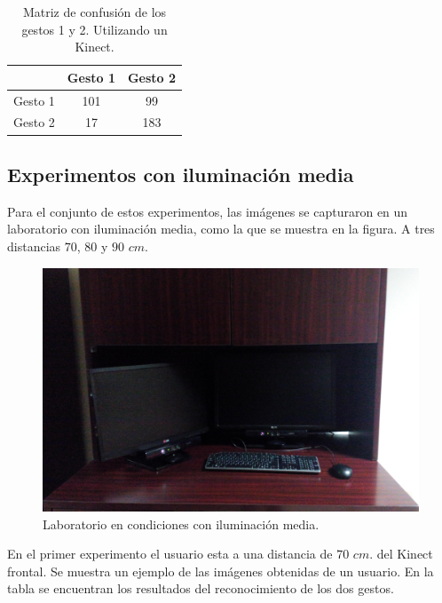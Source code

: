 \begin{table}[h!] 
\begin{center}
\begin{tabular}{ r || c | c |} 
 
        & Gesto 1 & Gesto 2 \\ \hline \hline  
Gesto 1 &  101   & 99      \\ \hline  
Gesto 2 &  17    & 183     \\   

\end{tabular}
\end{center} 
\caption{Matriz de confusión de los gestos 1 y 2. Utilizando un Kinect.}
\end{table} 

\subsection{Experimentos con iluminación media} 
Para el conjunto de estos experimentos, las imágenes se capturaron en un laboratorio con iluminación media, como la que se muestra en la figura. A tres distancias $70$, $80$ y $90$ $cm$.  

\begin{figure}[h!]
\begin{center} 
\includegraphics[scale=0.09]{./Figures/mediailuminacion.jpg}
\end{center}
\caption{Laboratorio en condiciones con iluminación media.}
\label{fig:LabMedioIluminado} 
\end{figure}  


En el primer experimento el usuario esta a una distancia de $70$ $cm.$ del Kinect frontal. Se muestra un ejemplo de las imágenes obtenidas de un usuario. En la tabla se encuentran los resultados del reconocimiento de los dos gestos.  

